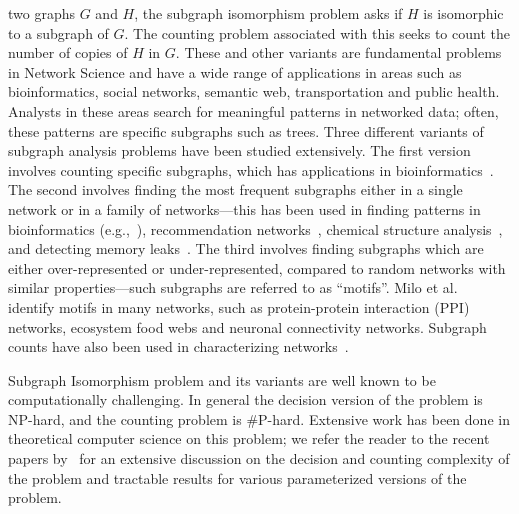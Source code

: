  two graphs $G$ and $H$, the subgraph isomorphism problem
asks if $H$ is isomorphic to a subgraph of $G$. The counting problem associated
with this seeks to count the number of copies of $H$ in $G$. These and other
variants are fundamental problems in Network Science and have a wide range of
applications in areas such as bioinformatics, social networks, semantic web,
transportation and public health.  Analysts in these areas search for meaningful
patterns in networked data; often, these patterns are specific subgraphs such as
trees.  Three different variants of subgraph analysis problems have been studied
extensively.  The first version involves counting specific subgraphs, which has
applications in bioinformatics~\cite{alon2008biomolecular,
huffner2008algorithm}.  The second involves finding the most frequent subgraphs
either in a single network or in a family of networks---this has been used in
finding patterns in bioinformatics (e.g.,~\cite{kuramochi2005finding}),
recommendation networks~\cite{leskovec2006patterns}, chemical structure
analysis~\cite{raymond2002maximum}, and detecting memory
leaks~\cite{maxwell2010diagnosing}. The third involves finding subgraphs which
are either over-represented or under-represented, compared to random networks
with similar properties---such subgraphs are referred to as ``motifs''. Milo et
al. ~\cite{milo2002network} identify motifs in many networks, such as
protein-protein interaction (PPI) networks, ecosystem food webs and neuronal
connectivity networks. Subgraph counts have also been used in characterizing
networks~\cite{przulj2007biological}.

Subgraph Isomorphism problem and its variants are well known to be
computationally challenging.  In general the decision version of the problem is
{\sf NP}-hard, and the counting problem is \#{\sf P}-hard.  Extensive work has
been done in theoretical computer science on this problem; we refer the reader
to the recent papers
by~\cite{marx2014everything,flum2004parameterized,curticapean2014complexity} for
an extensive discussion on the decision and counting complexity of the problem
and tractable results for various parameterized versions of the problem.

